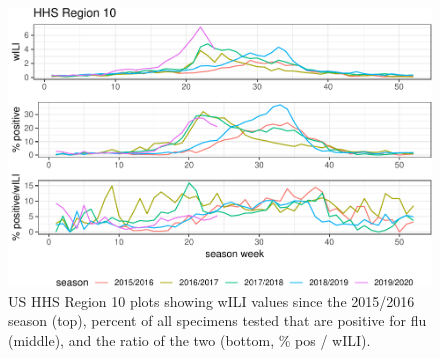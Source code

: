 \documentclass[]{article}
\begin{document}
\begin{figure}
\centering
\includegraphics{ili-labtest-report_files/figure-latex/region10-plot-1.pdf}
\caption{\label{fig:region10-plot}US HHS Region 10 plots showing wILI
values since the 2015/2016 season (top), percent of all specimens tested
that are positive for flu (middle), and the ratio of the two (bottom, \%
pos / wILI).}
\end{figure}
\end{document}
